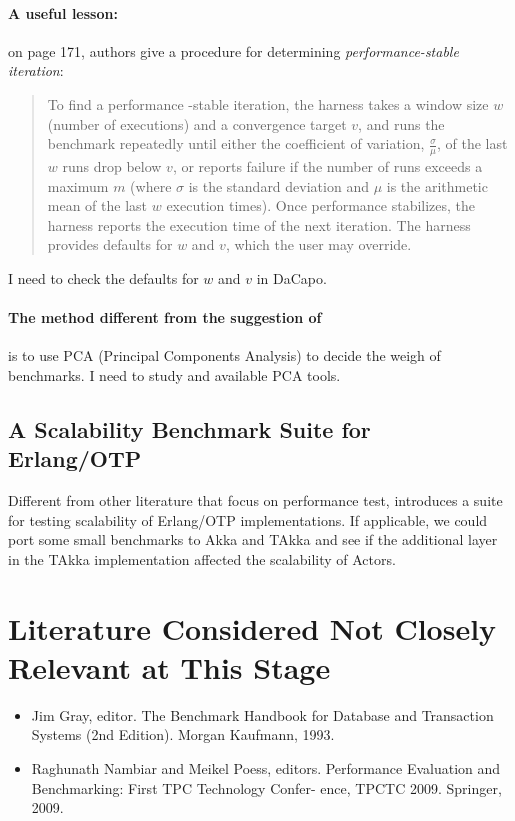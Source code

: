\documentclass[12pt, a4paper, twoside]{article}
\begin{document}
\paragraph{A useful lesson:}  on page 171, authors give a procedure for determining \emph{performance-stable iteration}:

\begin{quote} 
To find a performance -stable iteration, the harness takes a window size $w$ (number of executions) and a convergence target $v$, and runs the benchmark repeatedly until either the coefficient of variation, $\frac{\sigma}{\mu}$, of the last $w$ runs drop below $v$, or reports failure if the number of runs exceeds a maximum $m$ (where $\sigma$ is the standard deviation and $\mu$ is the arithmetic mean of the last $w$ execution times).  Once performance stabilizes, the harness reports the execution time of the next iteration.  The harness provides defaults for $w$ and $v$, which the user may override.
\end{quote}

I need to check the defaults for $w$ and $v$ in DaCapo.


\paragraph{The method different from the suggestion of \cite{HePa06}} is to use PCA (Principal Components Analysis) \cite{dunteman1989principal} to decide the weigh of benchmarks.  I need to study \cite{dunteman1989principal} and available PCA tools.



\subsection{A Scalability Benchmark Suite for Erlang/OTP \cite{bencherl}}

Different from other literature that focus on performance test, \cite{bencherl} introduces a suite for testing scalability of Erlang/OTP implementations.  If applicable, we could port some small benchmarks to Akka and TAkka and see if the additional layer in the TAkka implementation affected the scalability of Actors.


\section{Literature Considered Not Closely Relevant at This Stage}
\begin{itemize}
\item \cite{Gray93} Jim Gray, editor. The Benchmark Handbook for Database and
Transaction Systems (2nd Edition). Morgan Kaufmann, 1993.
\item \cite {Nambiar09} Raghunath Nambiar and Meikel Poess, editors. Performance
Evaluation and Benchmarking: First TPC Technology Confer-
ence, TPCTC 2009. Springer, 2009.
\end{itemize}
\end{document}
